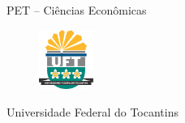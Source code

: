 \clearpage
\newpage
\onecolumn
\pagestyle{empty} %
\vspace*{\fill}
\centering
\footnotesize{PET -- Ciências Econômicas}
\begin{figure}[H]
	\centering
	\includegraphics[width=50pt]{logos/uft.png}
\end{figure}
\footnotesize{Universidade Federal do Tocantins}
